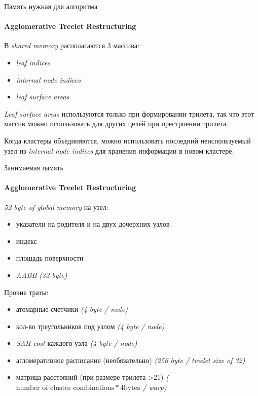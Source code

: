\documentclass{beamer}
\begin{document}
\begin{frame}[t]{Память нужная для алгоритма}
    \framesubtitle{Agglomerative Treelet Restructuring}
    В \textit{shared memory} располагаются 3 массива:
    \begin{itemize}
        \item
            \textit{leaf indices}
        \item
            \textit{internal node indices}
        \item
            \textit{leaf surface areas}
    \end{itemize}
    \textit{Leaf surface areas} используются только при формировании трилета, так что этот массив можно использовать для других целей
    при престроении трилета.

    Когда кластеры объединяются, можно использовать последний неиспользуемый узел из \textit{internal node indices} для хранения
    информации в новом кластере.
\end{frame}

\begin{frame}[t]{Занимаемая память}
    \framesubtitle{Agglomerative Treelet Restructuring}
    \textit{52 byte of global memory} на узел:
    \begin{itemize}
        \item
            указатели на родителя и на двух дочерхних узлов
        \item
            индекс
        \item
            площадь поверхности
        \item
            \textit{AABB (32 byte)}
    \end{itemize}
    Прочие траты:
    \begin{itemize}
        \item
            атомарные счетчики
            \textit{(4 byte / node)}
        \item
            кол-во треугольников под узлом
            \textit{(4 byte / node)}
        \item
            \textit{SAH-cost} каждого узла
            \textit{(4 byte / node)}
        \item
            агломеративное расписание (необязательно)
            \textit{(256 byte / treelet size of 32)}
        \item
            матрица расстояний (при размере трилета >21)
            \textit{($\text {number of cluster combinations} * 4 \text{bytes}$ / warp)}

    \end{itemize}

\end{frame}
\end{document}
